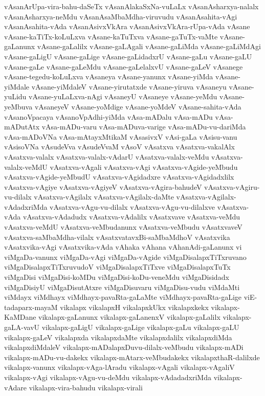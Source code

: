 {vAsanArUpa-vira-bahu-daSeTx
vAsanAlakaSxNa-vuLaLx
vAsanAsharxya-nalalx
vAsanAsharxya-neMdu
vAsanAsaMbaMdha-viruvudu
vAsanAsahita-vAgi
vAsanAsahita-vAda
vAsanAsivxVkAra
vAsanAsivxVkAra-rUpa-vAda
vAsane
vAsane-kaTiTx-koLuLxva
vAsane-kaTuTxva
vAsane-gaTuTx-vaMte
vAsane-gaLanunx
vAsane-gaLalilx
vAsane-gaLAgali
vAsane-gaLiMda
vAsane-gaLiMdAgi
vAsane-gaLigU
vAsane-gaLige
vAsane-gaLidadxrU
vAsane-gaLu
vAsane-gaLU
vAsane-gaLe
vAsane-gaLeMdu
vAsane-gaLelalxvU
vAsane-gaLeV
vAsanege
vAsane-tegedu-koLuLxva
vAsaneya
vAsane-yanunx
vAsane-yiMda
vAsane-yiMdale
vAsane-yiMdaleV
vAsane-yirutatxde
vAsane-yiruva
vAsaneyu
vAsane-yuLidu
vAsane-yuLaLxva-nAgi
vAsaneyU
vAsaneye
vAsane-yeMdu
vAsane-yeMbuva
vAsaneyeV
vAsane-yoMdige
vAsane-yoMdeV
vAsane-sahita-vAda
vAsanoVpacaya
vAsanoVpAdhi-yiMda
vAsa-mADalu
vAsa-mADu
vAsa-mADutAtx
vAsa-mADu-varu
vAsa-mADuva-varige
vAsa-mADu-vu-dariMda
vAsa-mADoVNa
vAsa-mAtayxMtikaM
vAsasivxV
vAsi-gaLa
vAsisu-vanu
vAsisoVNa
vAsudeVva
vAsudeVvaM
vAsoV
vAsatxva
vAsatxva-vakalAlx
vAsatxva-valalx
vAsatxva-valalx-vAdarU
vAsatxva-valalx-veMdu
vAsatxva-valalx-veMdU
vAsatxva-vAgali
vAsatxva-vAgi
vAsatxva-vAgide-yeMbudu
vAsatxva-vAgide-yeMbudU
vAsatxva-vAgidadxre
vAsatxva-vAgidadxlilx
vAsatxva-vAgiye
vAsatxva-vAgiyeV
vAsatxva-vAgira-bahudeV
vAsatxva-vAgiru-vu-dilalx
vAsatxva-vAgilalx
vAsatxva-vAgilalx-daMte
vAsatxva-vAgilalx-vAdadxriMda
vAsatxva-vAgu-vu-dilalx
vAsatxva-vAgu-vu-dilalxve
vAsatxva-vAda
vAsatxva-vAdadudx
vAsatxva-vAdalilx
vAsatxvave
vAsatxva-veMdu
vAsatxva-veMdU
vAsatxva-veMbudanunx
vAsatxva-veMbudu
vAsatxvaveV
vAsatxva-saMbaMdha-vilalx
vAsatxvatavxBi-saMbaMdhoV
vAsatxvika
vAsatxvika-vAgi
vAsatxvika-vAda
vAhaka
vAhana
vAhanAdi-gaLanunx
vi
viMgaDa-vanunx
viMgaDa-vAgi
viMgaDa-vAgide
viMgaDisalapxTiTxruvano
viMgaDisalapxTiTxruvudoV
viMgaDisalapxTiTxve
viMgaDisalapxTuTx
viMgaDisi
viMgaDisi-koMDu
viMgaDisi-koDu-veneMdu
viMgaDisidadx
viMgaDisiyU
viMgaDisutAtxre
viMgaDisuvaru
viMgaDisu-vudu
viMdaMti
viMdayx
viMdhayx
viMdhayx-pavaRta-gaLaMte
viMdhayx-pavaRta-gaLige
viE-tadaparx-mayaM
vikalapx
vikalapxH
vikalapxkUkx
vikalapxkekx
vikalapx-KaMDane
vikalapx-gaLanunx
vikalapx-gaLanenxV
vikalapx-gaLalilx
vikalapx-gaLA-vavU
vikalapx-gaLigU
vikalapx-gaLige
vikalapx-gaLu
vikalapx-gaLU
vikalapx-gaLeV
vikalapxda
vikalapxdaMte
vikalapxdalilx
vikalapxdiMda
vikalapxdiMdaleV
vikalapx-mADalapxDuvu-dilalx-veMbudu
vikalapx-mADi
vikalapx-mADu-vu-dakekx
vikalapx-mAtarx-veMbudakekx
vikalapxthaR-dalilxde
vikalapx-vanunx
vikalapx-vAga-lAradu
vikalapx-vAgali
vikalapx-vAgaliV
vikalapx-vAgi
vikalapx-vAgu-vu-deMdu
vikalapx-vAdadadxriMda
vikalapx-vAdare
vikalapx-vira-bahudu
vikalapx-virali
}
